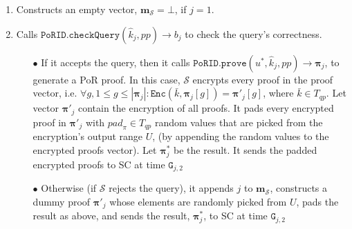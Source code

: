 \begin{enumerate}
\begin{enumerate}

\item Constructs an empty  vector, $\bm{m}_{\scriptscriptstyle\mathcal S}=\bot$, if $j=1$.  



\item Calls $\mathtt{PoRID.checkQuery}(\hat{k}_{\scriptscriptstyle j}, pp)\rightarrow b_{\scriptscriptstyle j}$ to check the query's correctness.

\begin{itemize}
\item[$\bullet$] If it accepts the query, then it calls $\mathtt{PoRID.prove}(u^{\scriptscriptstyle *},\hat{k}_{\scriptscriptstyle j},pp)\rightarrow  {\bm{\pi}}_{\scriptscriptstyle j}$, to generate a PoR  proof. In this case,  $\mathcal S$ encrypts every  proof in the proof vector, i.e. $\forall g, 1\leq g\leq| {\bm{\pi}}_{\scriptscriptstyle j}|: \mathtt{Enc}(\bar{k}, {\bm{\pi}}_{\scriptscriptstyle j}[g])= {\bm{\pi}}'_{\scriptscriptstyle j}[g]$, where $\bar{k}\in T_{\scriptscriptstyle qp}$. Let vector $ {\bm{\pi}}'_{\scriptscriptstyle j}$ contain the encryption of all proofs. It pads every encrypted proof in $ {\bm{\pi}}'_{\scriptscriptstyle j}$ with ${pad}_{\scriptscriptstyle \pi}\in T_{\scriptscriptstyle qp}$ random values that are picked from the encryption's output range $U$, (by appending the random values to the encrypted proofs vector). Let $\bm{\pi}^{\scriptscriptstyle *}_{\scriptscriptstyle j}$ be the result. It sends the padded encrypted proofs  to SC at time $\texttt{G}_{\scriptscriptstyle j,2}$ 
\item[$\bullet$] Otherwise (if $\mathcal S$ rejects the query), it appends $j$  to $ {\bm{m}}_{\scriptscriptstyle\mathcal{S}}$,  constructs a dummy proof $ {\bm{\pi}}'_{\scriptscriptstyle j}$ whose elements are randomly picked from $U$,  pads the result as above, and sends the result, $\bm{\pi}^{\scriptscriptstyle *}_{\scriptscriptstyle j}$, to SC at time $\texttt{G}_{\scriptscriptstyle j,2}$

\end{itemize}


%


\end{enumerate}
\end{enumerate}
